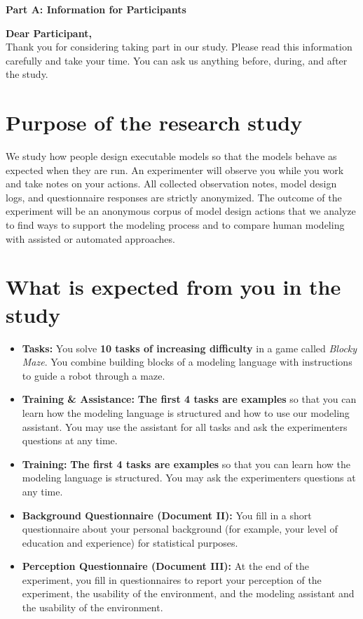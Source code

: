 \vspace{1em}
{\Large\bfseries Part A: Information for Participants}
\vspace{0.5em}

\textbf{Dear Participant,}\\
Thank you for considering taking part in our study. Please read this information carefully and take your time. You can ask us anything before, during, and after the study.

\section{Purpose of the research study}
We study how people design executable models so that the models behave as expected when they are run.
An experimenter will observe you while you work and take notes on your actions.
All collected observation notes, model design logs, and questionnaire responses are strictly anonymized.
The outcome of the experiment will be an anonymous corpus of model design actions that we analyze to find ways to support the modeling process and to compare human modeling with assisted or automated approaches.

\section{What is expected from you in the study}
\label{sec:participant-expectation}
\begin{itemize}[leftmargin=1.5em, itemsep=0pt, parsep=0pt, topsep=2pt]
  \item \textbf{Tasks:} You solve \textbf{10 tasks of increasing difficulty} in a game called \emph{Blocky Maze}. You combine building blocks of a modeling language with instructions to guide a robot through a maze.
  \iftreatment
  \item \textbf{Training \& Assistance:} \textbf{The first 4 tasks are examples} so that you can learn how the modeling language is structured and how to use our modeling assistant. You may use the assistant for all tasks and ask the experimenters questions at any time.
  \else
  \item \textbf{Training:} \textbf{The first 4 tasks are examples} so that you can learn how the modeling language is structured. You may ask the experimenters questions at any time.
  \fi
  \item \textbf{Background  Questionnaire (Document II):} You fill in a short questionnaire about your personal background (for example, your level of education and experience) for statistical purposes.
  \item \textbf{Perception Questionnaire (Document III):} At the end of the experiment, you fill in questionnaires to report your perception of the experiment\iftreatment, the usability of the environment, and the modeling assistant\else{} and the usability of the environment\fi.
\end{itemize}

